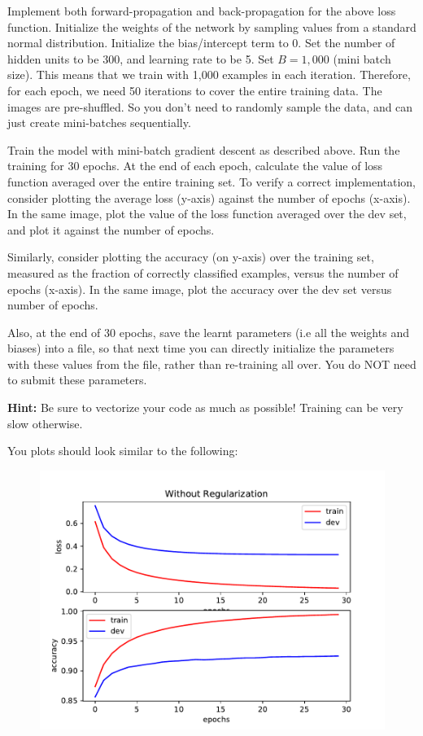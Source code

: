 \item {} 

Implement both forward-propagation and back-propagation for the above loss function.
Initialize the weights of the network by sampling values from a standard normal
distribution. Initialize the bias/intercept term to 0.
Set the number of hidden units to be 300, and learning rate to be 5. Set $B = 1,000$
(mini batch size). This means that we train with 1,000 examples in each iteration.
Therefore, for each epoch, we need 50 iterations to cover the entire training data.
The images are pre-shuffled. So you don't need to randomly sample the data, and can
just create mini-batches sequentially.


Train the model with mini-batch gradient descent
as described above. Run the training for 30 epochs. At the end of each epoch, calculate
the value of loss function averaged over the entire training set.  To verify a correct implementation, consider plotting the average loss (y-axis) against the number of epochs (x-axis). In the same image, plot the value of the loss function averaged over the dev set, and plot it against the number of epochs.

Similarly, consider plotting the accuracy (on y-axis) over the training set,
measured as the fraction of correctly classified examples, versus the number of epochs
(x-axis). In the same image, plot the accuracy over the dev set versus number of epochs.

Also, at the end of 30 epochs, save the learnt parameters (i.e all the weights and biases)
into a file, so that next time you can directly initialize the parameters with
these values from the file, rather than re-training all over. You do NOT need to
submit these parameters.


\textbf{Hint:} Be sure to vectorize your code as much as possible! Training can be
very slow otherwise.

\clearpage\newpage

You plots should look similar to the following:

\begin{figure}[H]
    \centering
    \includegraphics[scale=0.75]{mnist/src/baseline.pdf}
\end{figure}
